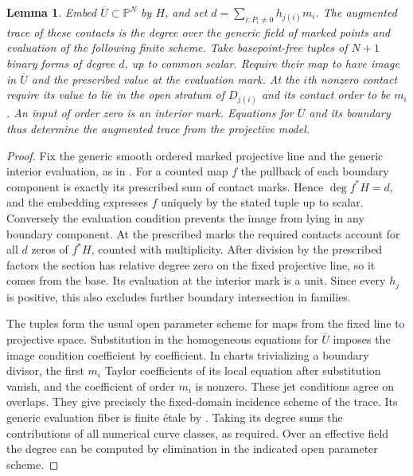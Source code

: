 \documentclass[11pt,reqno]{amsart}
\numberwithin{equation}{section}
\newtheorem{lemma}[theorem]{Lemma}
\theoremstyle{definition}
\theoremstyle{remark}
\begin{document}
\begin{lemma}\label{lem:projective-trace-equations}
Embed \(\overline U\subset\mathbb P^N\) by \(H\), and set
\(d=\sum_{i:P_i\ne0}h_{j(i)}m_i\). The augmented trace of these contacts
is the degree over the generic field of marked points and evaluation
of the following finite scheme. Take basepoint-free tuples of \(N+1\)
binary forms of degree \(d\), up to common scalar. Require their map
to have image in \(\overline U\) and the prescribed value at the evaluation mark.
At the \(i\)th nonzero contact require its value to lie in the open
stratum of \(D_{j(i)}\) and its contact order to be \(m_i\). An input
of order zero is an interior mark. Equations for \(\overline U\) and its boundary
thus determine the augmented trace from the projective model.
\end{lemma}
\begin{proof}
Fix the generic smooth ordered marked projective line and the generic
interior evaluation, as in \cite[Definition~1.1]{KY}. For a counted map
\(f\) the pullback of each boundary component is exactly its prescribed
sum of contact marks. Hence \(\deg f^*H=d\), and the embedding expresses
\(f\) uniquely by the stated tuple up to scalar. Conversely the evaluation
condition prevents the image from lying in any boundary component.
At the prescribed marks the required contacts account for all \(d\)
zeros of \(f^*H\), counted with multiplicity. After division by the
prescribed factors the section has relative degree zero on the fixed
projective line, so it comes from the base. Its evaluation at the
interior mark is a unit. Since every \(h_j\) is positive, this also
excludes further boundary intersection in families.

The tuples form the usual open parameter scheme for maps from the fixed
line to projective space. Substitution in the homogeneous equations for
\(\overline U\) imposes the image condition coefficient by coefficient. In charts
trivializing a boundary divisor, the first \(m_i\) Taylor coefficients
of its local equation after substitution vanish, and the coefficient of
order \(m_i\) is nonzero. These jet conditions agree on overlaps.
They give precisely the fixed-domain incidence scheme of the trace.
Its generic evaluation fiber is finite \'etale by
\cite[Proposition~3.13]{KY}. Taking its degree sums the contributions
of all numerical curve classes, as required. Over an effective field
the degree can be computed by elimination in the indicated open
parameter scheme.
\end{proof}
\end{document}
